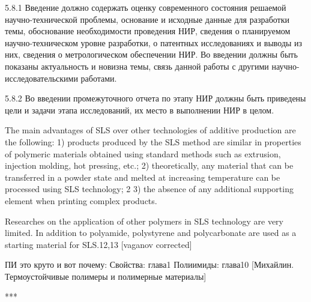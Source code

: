	5.8.1 Введение должно содержать оценку современного состояния решаемой научно-технической проблемы, основание и исходные данные для разработки темы, обоснование необходимости проведения НИР, сведения о планируемом научно-техническом уровне разработки, о патентных исследованиях и выводы из них, сведения о метрологическом обеспечении НИР. Во введении должны быть показаны актуальность и новизна темы, связь данной работы с другими научно-исследовательскими работами.

5.8.2 Во введении промежуточного отчета по этапу НИР должны быть приведены цели и задачи этапа исследований, их место в выполнении НИР в целом.
	




The main advantages of SLS over other technologies of additive production are the following: 1) products produced by the SLS method are similar in properties of polymeric materials obtained using standard methods such as extrusion, injection molding, hot pressing, etc.; 2) theoretically, any material that can be transferred in a powder state and melted at increasing temperature can be processed using SLS technology; 2 3) the absence of any additional supporting element when printing complex products.


	
	Researches on the application of other polymers in SLS technology are very limited. In addition to polyamide, polystyrene and polycarbonate are used as a starting material for SLS.12,13
	[vaganov corrected]
	

	
	ПИ это круто и вот почему:
	Свойства: глава1
	Полиимиды: глава10
	[Михайлин. Термоустойчивые полимеры и полимерные материалы]
	
	
	
	***
	
